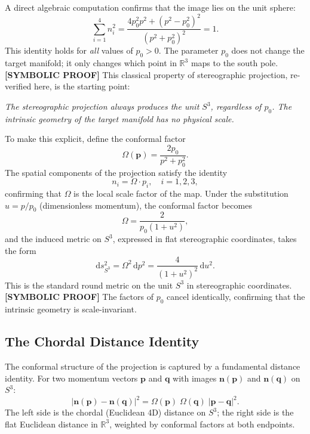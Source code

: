 \documentclass[aps,pra,twocolumn,superscriptaddress,longbibliography]{revtex4-2}
\begin{document}
A direct algebraic computation confirms that the image lies on the unit sphere:
\begin{equation}
\sum_{i=1}^{4} n_i^2 = \frac{4p_0^2 p^2 + (p^2 - p_0^2)^2}{(p^2 + p_0^2)^2} = 1.
\label{eq:unit_sphere}
\end{equation}
This identity holds for \textit{all} values of $p_0 > 0$. The parameter $p_0$ does not change the target manifold; it only changes which point in $\mathbb{R}^3$ maps to the south pole. \textbf{[SYMBOLIC PROOF]} This classical property of stereographic projection, re-verified here, is the starting point:

\medskip
\noindent\textit{The stereographic projection always produces the unit $S^3$, regardless of $p_0$. The intrinsic geometry of the target manifold has no physical scale.}
\medskip

To make this explicit, define the conformal factor
\begin{equation}
\Omega(\mathbf{p}) = \frac{2p_0}{p^2 + p_0^2}.
\label{eq:conformal_factor}
\end{equation}
The spatial components of the projection satisfy the identity
\begin{equation}
n_i = \Omega \cdot p_i, \quad i = 1, 2, 3,
\label{eq:ni_omega}
\end{equation}
confirming that $\Omega$ is the local scale factor of the map. Under the substitution $u = p/p_0$ (dimensionless momentum), the conformal factor becomes
\begin{equation}
\Omega = \frac{2}{p_0(1 + u^2)},
\end{equation}
and the induced metric on $S^3$, expressed in flat stereographic coordinates, takes the form
\begin{equation}
\mathrm{d}s^2_{S^3} = \Omega^2\, \mathrm{d}p^2 = \frac{4}{(1 + u^2)^2}\, \mathrm{d}u^2.
\label{eq:unit_metric}
\end{equation}
This is the standard round metric on the unit $S^3$ in stereographic coordinates. \textbf{[SYMBOLIC PROOF]} The factors of $p_0$ cancel identically, confirming that the intrinsic geometry is scale-invariant.

\subsection{The Chordal Distance Identity}

The conformal structure of the projection is captured by a fundamental distance identity. For two momentum vectors $\mathbf{p}$ and $\mathbf{q}$ with images $\mathbf{n}(\mathbf{p})$ and $\mathbf{n}(\mathbf{q})$ on $S^3$:
\begin{equation}
|\mathbf{n}(\mathbf{p}) - \mathbf{n}(\mathbf{q})|^2 = \Omega(\mathbf{p})\;\Omega(\mathbf{q})\; |\mathbf{p} - \mathbf{q}|^2.
\label{eq:chordal}
\end{equation}
The left side is the chordal (Euclidean 4D) distance on $S^3$; the right side is the flat Euclidean distance in $\mathbb{R}^3$, weighted by conformal factors at both endpoints.
\end{document}

